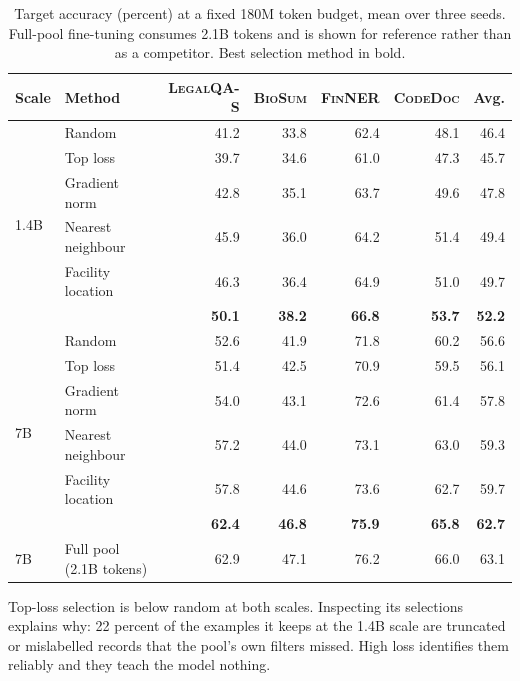 \begin{table}[t]
  \centering
  \small
  \caption{Target accuracy (percent) at a fixed 180M token budget, mean over
  three seeds. Full-pool fine-tuning consumes 2.1B tokens and is shown for
  reference rather than as a competitor. Best selection method in bold.}
  \label{tab:main}
  \begin{tabular}{llrrrrr}
    \toprule
    Scale & Method & \textsc{LegalQA-S} & \textsc{BioSum} & \textsc{FinNER}
          & \textsc{CodeDoc} & Avg. \\
    \midrule
    \multirow{6}{*}{1.4B}
      & Random                & 41.2 & 33.8 & 62.4 & 48.1 & 46.4 \\
      & Top loss              & 39.7 & 34.6 & 61.0 & 47.3 & 45.7 \\
      & Gradient norm         & 42.8 & 35.1 & 63.7 & 49.6 & 47.8 \\
      & Nearest neighbour     & 45.9 & 36.0 & 64.2 & 51.4 & 49.4 \\
      & Facility location     & 46.3 & 36.4 & 64.9 & 51.0 & 49.7 \\
      & \textbf{\method{}}    & \textbf{50.1} & \textbf{38.2} & \textbf{66.8}
                              & \textbf{53.7} & \textbf{52.2} \\
    \midrule
    \multirow{6}{*}{7B}
      & Random                & 52.6 & 41.9 & 71.8 & 60.2 & 56.6 \\
      & Top loss              & 51.4 & 42.5 & 70.9 & 59.5 & 56.1 \\
      & Gradient norm         & 54.0 & 43.1 & 72.6 & 61.4 & 57.8 \\
      & Nearest neighbour     & 57.2 & 44.0 & 73.1 & 63.0 & 59.3 \\
      & Facility location     & 57.8 & 44.6 & 73.6 & 62.7 & 59.7 \\
      & \textbf{\method{}}    & \textbf{62.4} & \textbf{46.8} & \textbf{75.9}
                              & \textbf{65.8} & \textbf{62.7} \\
    \midrule
    7B & Full pool (2.1B tokens) & 62.9 & 47.1 & 76.2 & 66.0 & 63.1 \\
    \bottomrule
  \end{tabular}
\end{table}

Top-loss selection is below random at both scales. Inspecting its selections
explains why: 22 percent of the examples it keeps at the 1.4B scale are
truncated or mislabelled records that the pool's own filters missed. High loss
identifies them reliably and they teach the model nothing.

